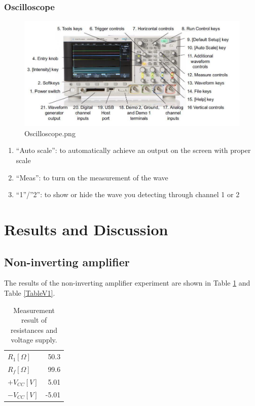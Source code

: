 \documentclass{article}
\begin{document}
\subsubsection{Oscilloscope}

\begin{figure}[H]
\centering
\includegraphics[scale=1.0]{oscilloscope.png}
\caption{Oscilloscope.png}\label{FigOs}
\end{figure}

\begin{enumerate}
\item “Auto scale”: to automatically achieve an output on the screen with proper scale
\item “Meas”: to turn on the measurement of the wave
\item “1”/”2”: to show or hide the wave you detecting through channel 1 or 2
\end{enumerate}



		\section{Results and Discussion}
		
	\subsection{Non-inverting amplifier}

The results of the non-inverting amplifier experiment are shown in Table \ref{TableO1} and Table \ref{TableV1}.

\begin{table}[H]
\centering
\begin{tabular}{lr}
\toprule
$R_1[\Omega]$ & 50.3\\
$R_f[\Omega]$ & 99.6\\
\midrule
$+V_{CC}[V]$ & 5.01\\
$-V_{CC}[V]$ & -5.01\\
\bottomrule
\end{tabular}
\caption{Measurement result of resistances and voltage supply.}\label{TableO1}
\end{table}
\end{document}
